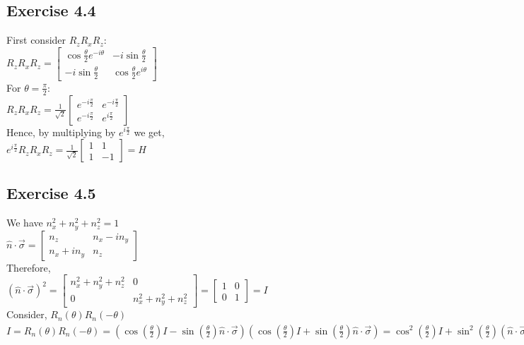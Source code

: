 \documentclass[a4paper,12pt]{article}
\begin{document}
\subsection*{Exercise 4.4}
First consider $R_zR_xR_z$:\\
$R_zR_xR_z=\begin{bmatrix}
    \cos{\frac{\theta}{2}}e^{-i\theta} & -i\sin{\frac{\theta}{2}}\\
    -i\sin{\frac{\theta}{2}} & \cos{\frac{\theta}{2}}e^{i\theta}
\end{bmatrix}$\\
For $\theta=\frac{\pi}{2}$:\\
$R_zR_xR_z=\frac{1}{\sqrt{2}}\begin{bmatrix}
  e^{-i\frac{\pi}{2}} &  e^{-i\frac{\pi}{2}} \\
  e^{-i\frac{\pi}{2}}  & e^{i\frac{\pi}{2}}
\end{bmatrix}$\\
Hence, by multiplying by $e^{i\frac{\pi}{2}}$ we get,\\
$e^{i\frac{\pi}{2}}R_zR_xR_z=\frac{1}{\sqrt{2}}\begin{bmatrix}
    1 &  1 \\
   1  & -1
  \end{bmatrix}=H$\\
\subsection*{Exercise 4.5}
We have $n_x^2+n_y^2+n_z^2=1$\\
$\hat{n}\cdot\vec{\sigma}=\begin{bmatrix}
    n_z& n_x-in_y\\
    n_x+in_y& n_z
\end{bmatrix}$\\
Therefore,\\
$(\hat{n}\cdot\vec{\sigma})^2=\begin{bmatrix}
    n_x^2+n_y^2+n_z^2&0\\
    0&n_x^2+n_y^2+n_z^2
\end{bmatrix}=\begin{bmatrix}
    1&0\\
    0&1
\end{bmatrix}=I$\\
Consider, $R_n(\theta)R_n(-\theta)$\\
$I=R_n(\theta)R_n(-\theta)=(\cos(\frac{\theta}{2})I-\sin(\frac{\theta}{2})\hat{n}\cdot\vec{\sigma})
(\cos(\frac{\theta}{2})I+\sin(\frac{\theta}{2})\hat{n}\cdot\vec{\sigma})=
\cos^2(\frac{\theta}{2})I+\sin^2(\frac{\theta}{2})(\hat{n}\cdot\vec{\sigma})^2=
(\cos^2(\frac{\theta}{2})+\sin^2(\frac{\theta}{2}))I=I$
\end{document}
